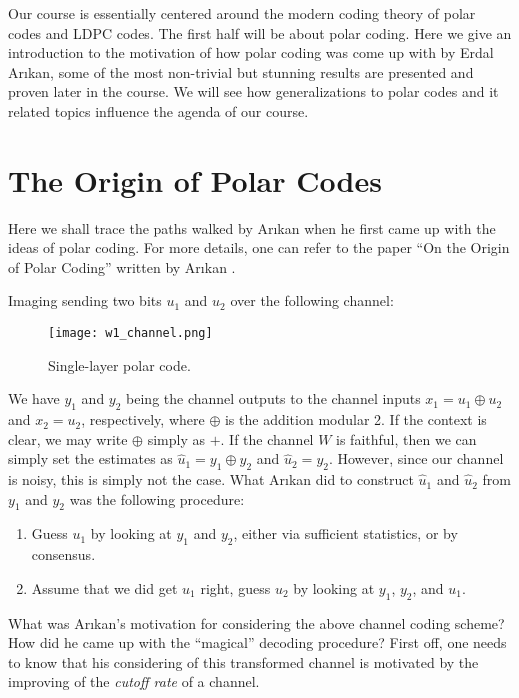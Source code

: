 
Our course is essentially centered around the modern coding theory of polar codes and LDPC codes. The first half will be about polar coding. Here we give an introduction to the motivation of how polar coding was come up with by Erdal Ar{\i}kan, some of the most non-trivial but stunning results are presented and proven later in the course. We will see how generalizations to polar codes and it related topics influence the agenda of our course.

\section{The Origin of Polar Codes} \label{sec:w1_origin_of_polar_code}

Here we shall trace the paths walked by Ar{\i}kan when he first came up with the ideas of polar coding. For more details, one can refer to the paper ``On the Origin of Polar Coding'' written by Ar{\i}kan \cite{Origin_of_Polar}.

Imaging sending two bits $u_1$ and $u_2$ over the following channel:
\begin{figure}[H]
    \centering
    \texttt{[image: w1\_channel.png]}
    \caption{Single-layer polar code.}
\end{figure}
We have $y_1$ and $y_2$ being the channel outputs to the channel inputs $x_1=u_1\oplus u_2$ and $x_2=u_2$, respectively, where $\oplus$ is the addition modular 2. If the context is clear, we may write $\oplus$ simply as $+$. If the channel $W$ is faithful, then we can simply set the estimates as $\hat{u}_1 = y_1 \oplus y_2$ and $\hat{u}_2 = y_2$. However, since our channel is noisy, this is simply not the case. What Ar{\i}kan did to construct $\hat{u}_1$ and $\hat{u}_2$ from $y_1$ and $y_2$ was the following procedure:
\begin{enumerate}
    \item Guess $u_1$ by looking at $y_1$ and $y_2$, either via sufficient statistics, or by consensus.
    \item Assume that we did get $u_1$ right, guess $u_2$ by looking at $y_1$, $y_2$, and $u_1$.
\end{enumerate}

What was Ar{\i}kan's motivation for considering the above channel coding scheme? How did he came up with the ``magical'' decoding procedure? First off, one needs to know that his considering of this transformed channel is motivated by the improving of the \textit{cutoff rate} of a channel.


